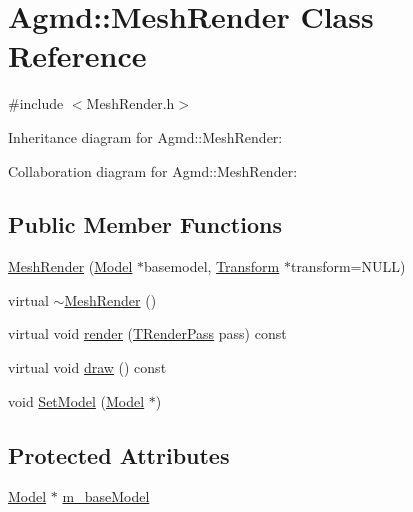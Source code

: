 \hypertarget{class_agmd_1_1_mesh_render}{\section{Agmd\+:\+:Mesh\+Render Class Reference}
\label{class_agmd_1_1_mesh_render}
}


{\ttfamily \#include $<$Mesh\+Render.\+h$>$}



Inheritance diagram for Agmd\+:\+:Mesh\+Render\+:


Collaboration diagram for Agmd\+:\+:Mesh\+Render\+:
\subsection*{Public Member Functions}
\begin{DoxyCompactItemize}
\item 
\hyperlink{class_agmd_1_1_mesh_render_a614e53595493d9062a0e9a8532ce2601}{Mesh\+Render} (\hyperlink{class_agmd_1_1_model}{Model} $\ast$basemodel, \hyperlink{class_agmd_maths_1_1_transform}{Transform} $\ast$transform=N\+U\+L\+L)
\item 
virtual \hyperlink{class_agmd_1_1_mesh_render_ab8346cd65314aac309ca3428a4b46b12}{$\sim$\+Mesh\+Render} ()
\item 
virtual void \hyperlink{class_agmd_1_1_mesh_render_a3052b6e1e2b1d90ab2a77f24444c6273}{render} (\hyperlink{namespace_agmd_a893087981df53d0bf39466e9039aeb73}{T\+Render\+Pass} pass) const 
\item 
virtual void \hyperlink{class_agmd_1_1_mesh_render_a4d0e321f6498e233ee0912032cda8c45}{draw} () const 
\item 
void \hyperlink{class_agmd_1_1_mesh_render_a27af8050f0e60744b324e6ba1f188271}{Set\+Model} (\hyperlink{class_agmd_1_1_model}{Model} $\ast$)
\end{DoxyCompactItemize}
\subsection*{Protected Attributes}
\begin{DoxyCompactItemize}
\item 
\hyperlink{class_agmd_1_1_model}{Model} $\ast$ \hyperlink{class_agmd_1_1_mesh_render_a2da7d4e5f734b3a991522637ff5a3288}{m\+\_\+base\+Model}
\end{DoxyCompactItemize}


